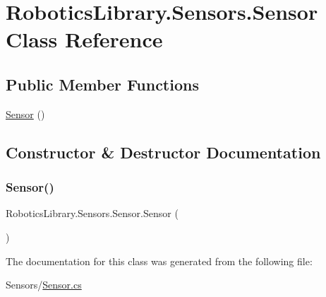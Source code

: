 \hypertarget{class_robotics_library_1_1_sensors_1_1_sensor}{}\section{Robotics\+Library.\+Sensors.\+Sensor Class Reference}
\label{class_robotics_library_1_1_sensors_1_1_sensor}
\subsection*{Public Member Functions}
\begin{DoxyCompactItemize}
\item 
\hyperlink{class_robotics_library_1_1_sensors_1_1_sensor_a9b515c2d60b74b55f7b9530073596a32}{Sensor} ()
\end{DoxyCompactItemize}


\subsection{Constructor \& Destructor Documentation}
\mbox{\label{class_robotics_library_1_1_sensors_1_1_sensor_a9b515c2d60b74b55f7b9530073596a32}} 
\subsubsection{\texorpdfstring{Sensor()}{Sensor()}}
{\footnotesize\ttfamily Robotics\+Library.\+Sensors.\+Sensor.\+Sensor (\begin{DoxyParamCaption}{ }\end{DoxyParamCaption})}



The documentation for this class was generated from the following file\+:\begin{DoxyCompactItemize}
\item 
Sensors/\hyperlink{_sensor_8cs}{Sensor.\+cs}\end{DoxyCompactItemize}
